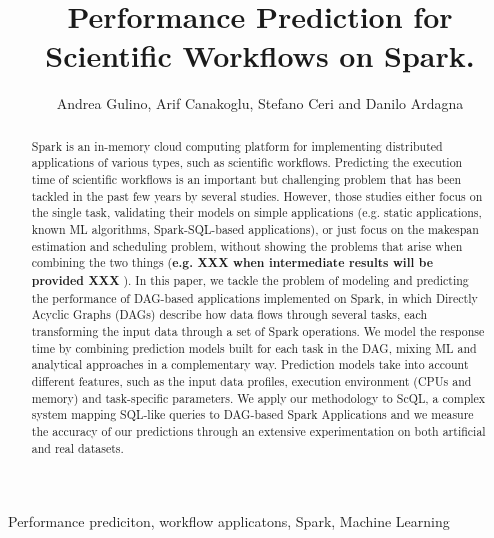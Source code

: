 \documentclass[a4paper, 10pt, conference]{ieeeconf}      %
\title{\LARGE \bf
Performance Prediction for Scientific Workflows on Spark. 
}
\author{Andrea Gulino, Arif Canakoglu, Stefano Ceri and Danilo Ardagna}
\begin{document}
\maketitle
\thispagestyle{empty}
\pagestyle{empty}


\begin{abstract}

Spark is an in-memory cloud computing platform for implementing distributed applications of various types, such as scientific workflows.
Predicting the execution time of scientific workflows is an important but challenging problem that has been tackled in the past few years by several studies. However, those studies either focus on the single task, validating their models on simple applications (e.g. static applications, known ML algorithms, Spark-SQL-based applications), or just focus on the makespan estimation and scheduling problem, without showing the problems that arise when combining the two things (\textbf{e.g. XXX when intermediate results will be provided XXX }).
In this paper, we tackle the problem of modeling and predicting the performance of DAG-based applications implemented on Spark, in which Directly Acyclic Graphs (DAGs) describe how data flows through several tasks, each transforming the input data through a set of Spark operations.
We model the response time by combining prediction models built for each task in the DAG, mixing ML and analytical approaches in a complementary way. 
Prediction models take into account different features, such as the input data profiles, execution environment (CPUs and memory) and task-specific parameters.
We apply our methodology to ScQL, a complex system mapping SQL-like queries to DAG-based Spark Applications and we measure the accuracy of our predictions through an extensive experimentation on both artificial and real datasets. 

\end{abstract}

\begin{keywords}
Performance prediciton, workflow applicatons, Spark, Machine Learning
\end{keywords}

\end{document}
